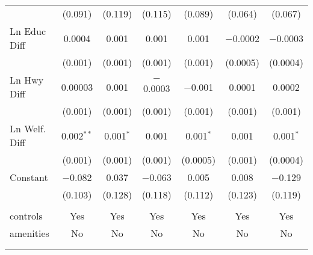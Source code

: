 \begin{table}[!htbp]
\begin{tabular}{@{\extracolsep{5pt}}lcccccc}
  & (0.091) & (0.119) & (0.115) & (0.089) & (0.064) & (0.067) \\ 
  Ln Educ Diff & 0.0004 & 0.001 & 0.001 & 0.001 & $-$0.0002 & $-$0.0003 \\ 
  & (0.001) & (0.001) & (0.001) & (0.001) & (0.0005) & (0.0004) \\ 
  Ln Hwy Diff & 0.00003 & 0.001 & $-$0.0003 & $-$0.001 & 0.0001 & 0.0002 \\ 
  & (0.001) & (0.001) & (0.001) & (0.001) & (0.001) & (0.001) \\ 
  Ln Welf. Diff & 0.002$^{**}$ & 0.001$^{*}$ & 0.001 & 0.001$^{*}$ & 0.001 & 0.001$^{*}$ \\ 
  & (0.001) & (0.001) & (0.001) & (0.0005) & (0.001) & (0.0004) \\ 
  Constant & $-$0.082 & 0.037 & $-$0.063 & 0.005 & 0.008 & $-$0.129 \\ 
  & (0.103) & (0.128) & (0.118) & (0.112) & (0.123) & (0.119) \\ 
 \hline \\[-1.8ex] 
controls & Yes & Yes & Yes & Yes & Yes & Yes \\ 
amenities & No & No & No & No & No & No \\ 
\hline \\[-1.8ex] 
\hline 
\hline \\[-1.8ex] 
\end{tabular} 
\end{table} 
